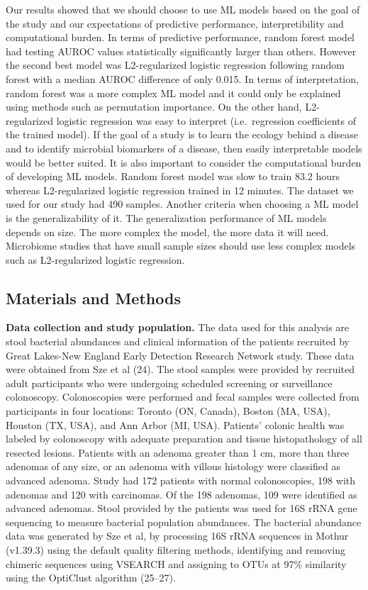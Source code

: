 \documentclass[11pt,]{article}
\begin{document}
Our results showed that we should choose to use ML models based on the
goal of the study and our expectations of predictive performance,
interpretibility and computational burden. In terms of predictive
performance, random forest model had testing AUROC values statistically
significantly larger than others. However the second best model was
L2-regularized logistic regression following random forest with a median
AUROC difference of only 0.015. In terms of interpretation, random
forest was a more complex ML model and it could only be explained using
methods such as permutation importance. On the other hand,
L2-regularized logistic regression was easy to interpret
(i.e.~regression coefficients of the trained model). If the goal of a
study is to learn the ecology behind a disease and to identify microbial
biomarkers of a disease, then easily interpretable models would be
better suited. It is also important to consider the computational burden
of developing ML models. Random forest model was slow to train 83.2
hours whereas L2-regularized logistic regression trained in 12 minutes.
The dataset we used for our study had 490 samples. Another criteria when
choosing a ML model is the generalizability of it. The generalization
performance of ML models depends on size. The more complex the model,
the more data it will need. Microbiome studies that have small sample
sizes should use less complex models such as L2-regularized logistic
regression.

\subsection{Materials and Methods}\label{materials-and-methods}

\textbf{Data collection and study population.} The data used for this
analysis are stool bacterial abundances and clinical information of the
patients recruited by Great Lakes-New England Early Detection Research
Network study. These data were obtained from Sze et al (24). The stool
samples were provided by recruited adult participants who were
undergoing scheduled screening or surveillance colonoscopy.
Colonoscopies were performed and fecal samples were collected from
participants in four locations: Toronto (ON, Canada), Boston (MA, USA),
Houston (TX, USA), and Ann Arbor (MI, USA). Patients' colonic health was
labeled by colonoscopy with adequate preparation and tissue
histopathology of all resected lesions. Patients with an adenoma greater
than 1 cm, more than three adenomas of any size, or an adenoma with
villous histology were classified as advanced adenoma. Study had 172
patients with normal colonoscopies, 198 with adenomas and 120 with
carcinomas. Of the 198 adenomas, 109 were identified as advanced
adenomas. Stool provided by the patients was used for 16S rRNA gene
sequencing to measure bacterial population abundances. The bacterial
abundance data was generated by Sze et al, by processing 16S rRNA
sequences in Mothur (v1.39.3) using the default quality filtering
methods, identifying and removing chimeric sequences using VSEARCH and
assigning to OTUs at 97\% similarity using the OptiClust algorithm
(25--27).
\end{document}
